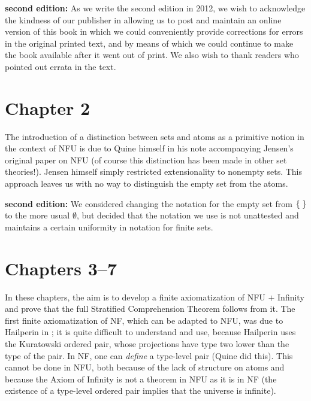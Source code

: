 {\bf second edition:}  As we write the second edition in 2012, we wish to acknowledge the kindness of our publisher in allowing us to post and maintain 
an online version of this book in which we could conveniently provide corrections for errors in the original printed text, and by means of which we could continue to make the book available after it went out of print.  We also wish to thank readers who pointed out errata in the text.



\section*{Chapter 2}

The introduction of a distinction between sets and atoms as a
primitive notion in the context of NFU is due to Quine himself
in his note accompanying Jensen's original paper \cite{jensen} on
NFU (of course this distinction has been made in other set
theories!).  Jensen himself simply restricted
extensionality to 
nonempty sets.  This approach leaves us with no way to distinguish the
empty set from the atoms.

{\bf second edition:}  We considered changing the notation for the empty set from $\mbox{$\{\;\}$}$ to the more usual $\emptyset$, but decided that the notation we use is not unattested and maintains a certain uniformity in notation for finite sets.  



\section*{Chapters 3--7}

In these chapters, the aim is to develop a finite axiomatization of
NFU $+$ Infinity and prove that the full Stratified
Comprehension Theorem follows from it.
The first finite axiomatization of NF, which can
be adapted to NFU, was due to Hailperin in
\cite{hailperin}; it is quite difficult to understand and use, because
Hailperin uses the Kuratowski ordered pair,
whose projections
have type two lower than the type of the pair.  In NF, one can
{\itshape define\/} a type-level pair (Quine did
this).  This cannot be done in NFU, both because of the lack of
structure on atoms 
and because the Axiom of Infinity is not a theorem in
NFU as
it is in NF (the existence of a type-level ordered pair
implies that the universe is
infinite).

